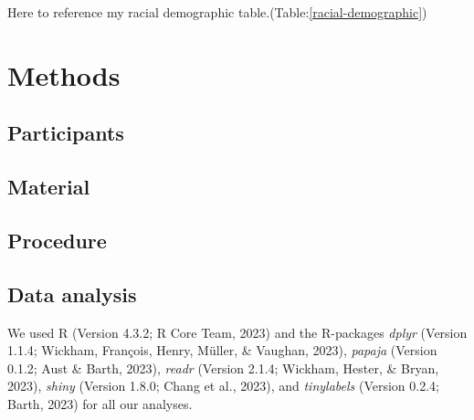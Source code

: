 \documentclass[
  man]{apa6}
\begin{document}
Here to reference my racial demographic table.(Table:\ref{racial-demographic})

\begin{table}
\centering
\caption{\label{tab:racial-demographic}Racial Demographics}
\centering
{}
\end{table}

\hypertarget{methods}{%
\section{Methods}\label{methods}}

\hypertarget{participants}{%
\subsection{Participants}\label{participants}}

\hypertarget{material}{%
\subsection{Material}\label{material}}

\hypertarget{procedure}{%
\subsection{Procedure}\label{procedure}}

\hypertarget{data-analysis}{%
\subsection{Data analysis}\label{data-analysis}}

We used R (Version 4.3.2; R Core Team, 2023) and the R-packages \emph{dplyr} (Version 1.1.4; Wickham, François, Henry, Müller, \& Vaughan, 2023), \emph{papaja} (Version 0.1.2; Aust \& Barth, 2023), \emph{readr} (Version 2.1.4; Wickham, Hester, \& Bryan, 2023), \emph{shiny} (Version 1.8.0; Chang et al., 2023), and \emph{tinylabels} (Version 0.2.4; Barth, 2023) for all our analyses.
\end{document}
